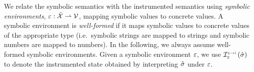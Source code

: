 %

We relate the symbolic semantics with the instrumented semantics using 
\emph{symbolic environments}, $\varepsilon : \hat{\mathcal{X}} \rightharpoonup \mathcal{V}$, mapping 
symbolic values to concrete values. 
A symbolic environment is \emph{well-formed} if it maps symbolic 
values to concrete values of the appropriate type (i.e.~symbolic strings are mapped to strings 
and symbolic numbers are mapped to numbers). In the following, we always 
assume well-formed symbolic environments. 
%
Given a symbolic environment $\varepsilon$, we use $\interpret{\symbinst}{\senv}(\sstate)$ to 
denote the instrumented state obtained by interpreting $\hat{\sigma}$ under $\varepsilon$.  

